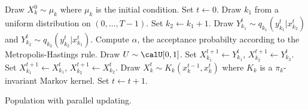 \begin{algorithm}
\begin{algorithmic}
  \tophrule
    \STATE Draw $X_k^0\sim\mu_k$ where $\mu_k$ is the initial condition.
  \ENDFOR
  \STATE Set $t\leftarrow0$.
  \REPEAT
    \STATE Draw $k_1$ from a uniform distribution on $(0,\dots,T-1)$. Set
    $k_2\leftarrow k_1 + 1$.
    \STATE Draw $Y_{k_1}^t\sim q_{k_1}(y_{k_1}^t|x_{k_2}^t)$ and
    $Y_{k_2}^t\sim q_{k_2}(y_{k_2}^t|x_{k_1}^t)$.
    \STATE Compute $\alpha$, the acceptance probabilty according to the
    Metropolis-Hastings rule.
    \STATE Draw $U\sim\calU[0,1]$.
      \STATE Set $X_{k_1}^{t+1}\leftarrow Y_{k_1}^t$, $X_{k_2}^{t+1}\leftarrow
          Y_{k_2}^t$.
    \ELSE
      \STATE Set $X_{k_1}^{t+1}\leftarrow X_{k_1}^t$, $X_{k_2}^{t+1}\leftarrow
          X_{k_2}^t$.
    \ENDIF
      \STATE Draw $X_k^t\sim K_k(x_k^{t-1},x_k^t)$ where $K_k$ is a
      $\pi_k$-invariant Markov kernel.
    \ENDFOR
    \STATE Set $t\leftarrow t+1$.
  \bottomhrule
\end{algorithmic}
\caption{Population \mcmc with parallel updating.}
\label{alg:pmcmc}
\end{algorithm}
